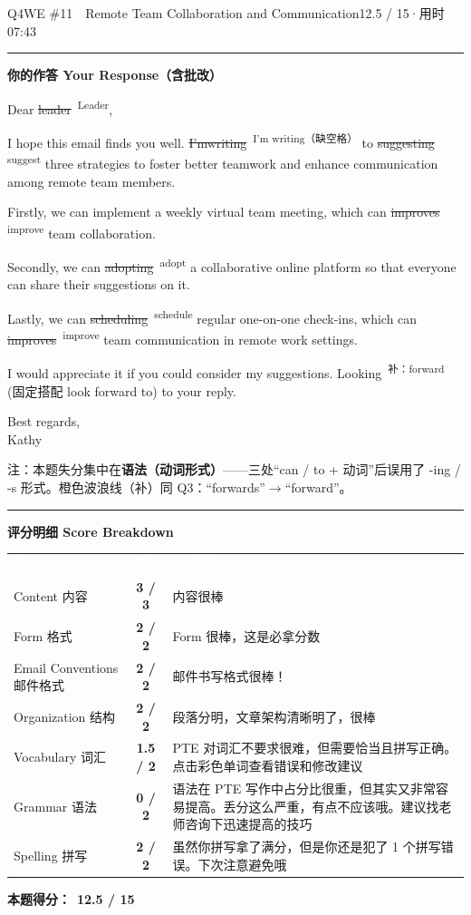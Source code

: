 \documentclass[11pt]{article}
\newcommand{\fix}[2]{%
  \colorbox{cWrongBg}{\textcolor{cWrong}{\sout{#1}}}%
  \,\textsuperscript{\textcolor{cFix}{\footnotesize #2}}}
\newcommand{\add}[2]{%
  \textcolor{cAdd}{\uwave{#1}}%
  \,\textsuperscript{\textcolor{cAdd}{\footnotesize 补：#2}}}
\newcommand{\sfull}[1]{\textcolor{cFix}{\bfseries #1}}     %
\newcommand{\spart}[1]{\textcolor{cPartial}{\bfseries #1}} %
\newcommand{\szero}[1]{\textcolor{cWrong}{\bfseries #1}}   %
\newcommand{\ptesub}[1]{%
  \par\needspace{2\baselineskip}\smallskip
  {\color{cAccent}\rule[-0.2ex]{3pt}{1.05em}}\hspace{6pt}%
  {\bfseries\color{cHead}#1}\par\nopagebreak\smallskip}
\newcommand{\scorehead}{%
  \rowcolors{2}{cGrayBox}{white}
  \arrayrulecolor{cRule}}
\begin{document}
\begin{qblock}{Q4\quad WE \#11\ \ Remote Team Collaboration and Communication}{12.5 / 15\quad·\quad 用时 07:43}
\ptesub{你的作答 Your Response（含批改）}
\begin{youbox}
Dear \fix{leader}{Leader},

I hope this email finds you well. \fix{I'mwriting}{I'm writing（缺空格）} to \fix{suggesting}{suggest} three strategies to foster better teamwork and enhance communication among remote team members.

Firstly, we can implement a weekly virtual team meeting, which can \fix{improves}{improve} team collaboration.

Secondly, we can \fix{adopting}{adopt} a collaborative online platform so that everyone can share their suggestions on it.

Lastly, we can \fix{scheduling}{schedule} regular one-on-one check-ins, which can \fix{improves}{improve} team communication in remote work settings.

I would appreciate it if you could consider my suggestions. Looking \add{forwards}{forward}\,(固定搭配 look forward to) to your reply.

Best regards,\\ Kathy
\end{youbox}
{\footnotesize\color{gray} 注：本题失分集中在\textbf{语法（动词形式）}——三处“can / to + 动词”后误用了 -ing / -s 形式。橙色波浪线（补）同 Q3：``forwards''$\to$``forward''。}

\ptesub{评分明细 Score Breakdown}
{\small\scorehead
\begin{tabularx}{\linewidth}{l c Y}
\textcolor{white}{\bfseries 维度} & \textcolor{white}{\bfseries 得分} & \textcolor{white}{\bfseries AI 建议}\\
Content 内容              & \sfull{3 / 3} & 内容很棒\\
Form 格式                & \sfull{2 / 2} & Form 很棒，这是必拿分数\\
Email Conventions 邮件格式 & \sfull{2 / 2} & 邮件书写格式很棒！\\
Organization 结构         & \sfull{2 / 2} & 段落分明，文章架构清晰明了，很棒\\
Vocabulary 词汇           & \spart{1.5 / 2} & PTE 对词汇不要求很难，但需要恰当且拼写正确。点击彩色单词查看错误和修改建议\\
Grammar 语法              & \szero{0 / 2}   & 语法在 PTE 写作中占分比很重，但其实又非常容易提高。丢分这么严重，有点不应该哦。建议找老师咨询下迅速提高的技巧\\
Spelling 拼写             & \sfull{2 / 2} & 虽然你拼写拿了满分，但是你还是犯了 1 个拼写错误。下次注意避免哦\\
\end{tabularx}}
\smallskip
\textbf{本题得分：}\ {\color{cAccent}\bfseries 12.5 / 15}

\end{qblock}
\end{document}
